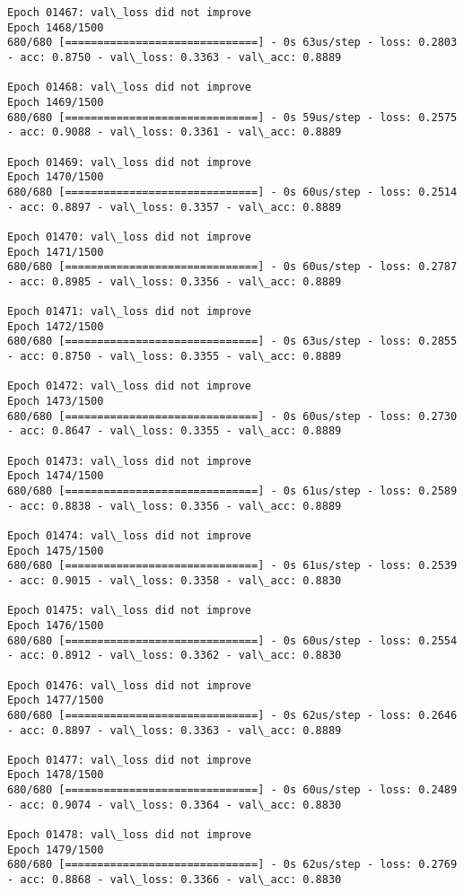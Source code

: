 \documentclass[11pt]{article}
\begin{document}
\begin{Verbatim}[commandchars=\\\{\}]
Epoch 01467: val\_loss did not improve
Epoch 1468/1500
680/680 [==============================] - 0s 63us/step - loss: 0.2803 - acc: 0.8750 - val\_loss: 0.3363 - val\_acc: 0.8889

Epoch 01468: val\_loss did not improve
Epoch 1469/1500
680/680 [==============================] - 0s 59us/step - loss: 0.2575 - acc: 0.9088 - val\_loss: 0.3361 - val\_acc: 0.8889

Epoch 01469: val\_loss did not improve
Epoch 1470/1500
680/680 [==============================] - 0s 60us/step - loss: 0.2514 - acc: 0.8897 - val\_loss: 0.3357 - val\_acc: 0.8889

Epoch 01470: val\_loss did not improve
Epoch 1471/1500
680/680 [==============================] - 0s 60us/step - loss: 0.2787 - acc: 0.8985 - val\_loss: 0.3356 - val\_acc: 0.8889

Epoch 01471: val\_loss did not improve
Epoch 1472/1500
680/680 [==============================] - 0s 63us/step - loss: 0.2855 - acc: 0.8750 - val\_loss: 0.3355 - val\_acc: 0.8889

Epoch 01472: val\_loss did not improve
Epoch 1473/1500
680/680 [==============================] - 0s 60us/step - loss: 0.2730 - acc: 0.8647 - val\_loss: 0.3355 - val\_acc: 0.8889

Epoch 01473: val\_loss did not improve
Epoch 1474/1500
680/680 [==============================] - 0s 61us/step - loss: 0.2589 - acc: 0.8838 - val\_loss: 0.3356 - val\_acc: 0.8889

Epoch 01474: val\_loss did not improve
Epoch 1475/1500
680/680 [==============================] - 0s 61us/step - loss: 0.2539 - acc: 0.9015 - val\_loss: 0.3358 - val\_acc: 0.8830

Epoch 01475: val\_loss did not improve
Epoch 1476/1500
680/680 [==============================] - 0s 60us/step - loss: 0.2554 - acc: 0.8912 - val\_loss: 0.3362 - val\_acc: 0.8830

Epoch 01476: val\_loss did not improve
Epoch 1477/1500
680/680 [==============================] - 0s 62us/step - loss: 0.2646 - acc: 0.8897 - val\_loss: 0.3363 - val\_acc: 0.8889

Epoch 01477: val\_loss did not improve
Epoch 1478/1500
680/680 [==============================] - 0s 60us/step - loss: 0.2489 - acc: 0.9074 - val\_loss: 0.3364 - val\_acc: 0.8830

Epoch 01478: val\_loss did not improve
Epoch 1479/1500
680/680 [==============================] - 0s 62us/step - loss: 0.2769 - acc: 0.8868 - val\_loss: 0.3366 - val\_acc: 0.8830


\end{Verbatim}
\end{document}
